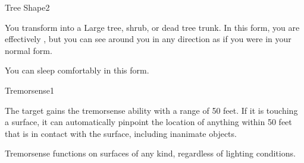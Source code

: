 \begin{spellsection}{Tree Shape}{2}
    \begin{spellheader}
    \end{spellheader}
    \begin{spellcontent}
        \begin{spelltargetinginfo}
        \end{spelltargetinginfo}
        \begin{spelleffects}
            \spelleffect You transform into a Large tree, shrub, or dead tree trunk. In this form, you are effectively \paralyzed, but you can see around you in any direction as if you were in your normal form.
            \spelldur \durext \dismissable
        \end{spelleffects}
    \end{spellcontent}
    \begin{spellfooter}
        \spellnotes You can sleep comfortably in this form.
        \miscastexplode
    \end{spellfooter}
\end{spellsection}

\begin{spellsection}{Tremorsense}{1}
    \begin{spellheader}
    \end{spellheader}
    \begin{spellcontent}
        \begin{spelltargetinginfo}
        \end{spelltargetinginfo}
        \begin{spelleffects}
            \spelleffect The target gains the tremorsense ability with a range of 50 feet. If it is touching a surface, it can automatically pinpoint the location of anything within 50 feet that is in contact with the surface, including inanimate objects.
            \spelldur \durpersonallong
        \end{spelleffects}
    \end{spellcontent}
    \begin{spellfooter}
        \spellnotes Tremorsense functions on surfaces of any kind, regardless of lighting conditions.
        \miscastexplode
    \end{spellfooter}
\end{spellsection}

